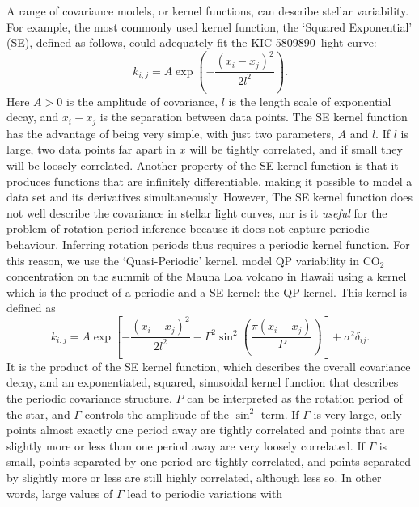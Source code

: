 \documentclass[a4paper,fleqn,usenatbib,useAMS]{mnras}
\newcommand{\eg}{{\it e.g.}}
\newcommand{\kepexample}{5809890}
\begin{document}
A range of covariance models, or kernel functions, can describe stellar
variability.
For example, the most commonly used kernel function, the `Squared
Exponential' (SE), defined as follows, could adequately fit the
KIC \kepexample\ light curve:
\begin{equation}
\label{eq:SE}
k_{i,j} = A \exp \left(-\frac{(x_i - x_j)^2}{2l^2} \right).
\end{equation}
Here $A>0$ is the amplitude of covariance, $l$ is the length scale of
exponential decay, and $x_i-x_j$ is the separation between data points.
The SE kernel function has the advantage of being very simple, with
just two parameters, $A$ and $l$.
If $l$ is large, two data points far apart in $x$ will be tightly correlated,
and if small they will be loosely correlated.
Another property of the SE kernel function is that it produces functions that
are infinitely differentiable, making it possible to model a data set
and its derivatives simultaneously.
However, The SE kernel function does not well describe the covariance
in stellar light curves, nor is it {\it useful} for the problem of
rotation period inference because it does not capture periodic behaviour.
Inferring rotation periods thus requires a periodic kernel
function.
For this reason, we use the `Quasi-Periodic' kernel.
\citet{Rasmussen2005} model QP variability in CO$_2$ concentration on the
summit of the Mauna Loa volcano in Hawaii \citep[data from][]{Keeling2004}
using a kernel which is the product of a periodic and a SE kernel: the QP
kernel.
This kernel is defined as
\begin{equation}
\label{eq:QP}
k_{i,j} = A \exp \left[-\frac{(x_i - x_j)^2}{2l^2} -
    \Gamma^2 \sin^2\left(\frac{\pi(x_i - x_j)}{P}\right) \right] + \sigma^2
    \delta_{ij}.
\end{equation}
It is the product of the SE kernel function, which describes the overall
covariance decay, and an exponentiated, squared, sinusoidal kernel function
that describes the periodic covariance structure.
$P$ can be interpreted as the rotation period of the star, and $\Gamma$
controls the amplitude of the $\sin^2$ term.
If $\Gamma$ is very large, only points almost exactly one period away are
tightly correlated and points that are slightly more or less than one period
away are very loosely correlated.
If $\Gamma$ is small, points separated by one period are tightly
correlated, and points separated by slightly more or less are still highly
correlated, although less so.
In other words, large values of $\Gamma$ lead to periodic variations with
\end{document}
